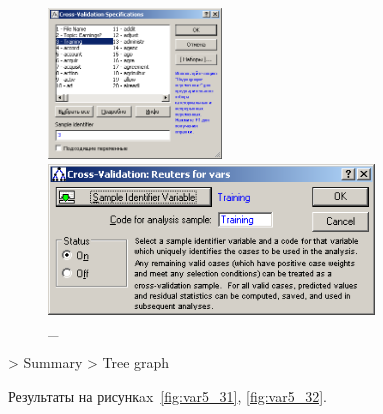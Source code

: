 \begin{figure}[!h]
  \centering

  \begin{minipage}{0.49\textwidth}
    \centering

    \includegraphics[height=4cm]
    {inc/var5/29.PNG}

    \caption{\_}

    \label{fig:var5_29}
  \end{minipage}
  \begin{minipage}{0.49\textwidth}
    \centering

    \includegraphics[height=4cm]
    {inc/var5/30.PNG}

    \caption{\_}

    \label{fig:var5_30}
  \end{minipage}
\end{figure}

\newpage

> Summary > Tree graph

Результаты на рисункax~\ref{fig:var5_31}, \ref{fig:var5_32}.

